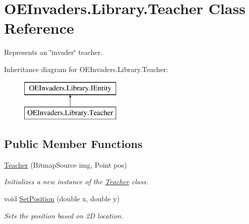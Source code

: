 \hypertarget{class_o_e_invaders_1_1_library_1_1_teacher}{}\section{O\+E\+Invaders.\+Library.\+Teacher Class Reference}
\label{class_o_e_invaders_1_1_library_1_1_teacher}


Represents an \char`\"{}invader\char`\"{} teacher.  


Inheritance diagram for O\+E\+Invaders.\+Library.\+Teacher\+:\begin{figure}[H]
\begin{center}
\leavevmode
\includegraphics[height=2.000000cm]{class_o_e_invaders_1_1_library_1_1_teacher}
\end{center}
\end{figure}
\subsection*{Public Member Functions}
\begin{DoxyCompactItemize}
\item 
\mbox{\hyperlink{class_o_e_invaders_1_1_library_1_1_teacher_a1498608efc14782423937fe5ac3b7029}{Teacher}} (Bitmap\+Source img, Point pos)
\begin{DoxyCompactList}\small\item\em Initializes a new instance of the \mbox{\hyperlink{class_o_e_invaders_1_1_library_1_1_teacher}{Teacher}} class. \end{DoxyCompactList}\item 
void \mbox{\hyperlink{class_o_e_invaders_1_1_library_1_1_teacher_a5ee45609f0cead5d7aad77b20c5c7be0}{Set\+Position}} (double x, double y)
\begin{DoxyCompactList}\small\item\em Sets the position based on 2D location. \end{DoxyCompactList}\end{DoxyCompactItemize}
